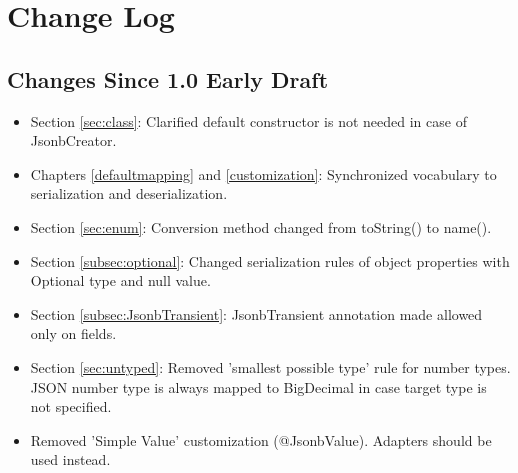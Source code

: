 \chapter{Change Log}

\section{Changes Since 1.0 Early Draft}

\begin{itemize}
\item Section \ref{sec:class}: Clarified default constructor is not needed in case of JsonbCreator.
\item Chapters \ref{defaultmapping} and \ref{customization}: Synchronized vocabulary to serialization and deserialization.
\item Section \ref{sec:enum}: Conversion method changed from toString() to name().
\item Section \ref{subsec:optional}: Changed serialization rules of object properties with Optional type and null value.
\item Section \ref{subsec:JsonbTransient}: JsonbTransient annotation made allowed only on fields.
\item Section \ref{sec:untyped}: Removed 'smallest possible type' rule for number types. JSON number type is always mapped to BigDecimal in case target type is not specified.
\item Removed 'Simple Value' customization (@JsonbValue). Adapters should be used instead.
\end{itemize}
